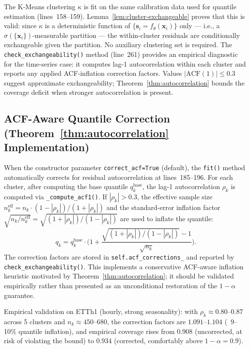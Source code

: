 \documentclass[11pt]{article}
\begin{document}
The K-Means clustering $\kappa$ is fit on the same calibration data used for quantile estimation (lines~158--159). Lemma~\ref{lem:cluster-exchangeable} proves that this is valid: since $\kappa$ is a deterministic function of $\{\mathbf{s}_i = f_\theta(\mathbf{x}_i)\}$ only — i.e., a $\sigma(\{\mathbf{x}_i\})$-measurable partition — the within-cluster residuals are conditionally exchangeable given the partition. No auxiliary clustering set is required. The \texttt{check\_exchangeability()} method (line~261) provides an empirical diagnostic for the time-series case: it computes lag-1 autocorrelation within each cluster and reports any applied ACF-inflation correction factors. Values $|\text{ACF}(1)| \leq 0.3$ suggest approximate exchangeability; Theorem~\ref{thm:autocorrelation} bounds the coverage deficit when stronger autocorrelation is present.

\subsection*{ACF-Aware Quantile Correction (Theorem~\ref{thm:autocorrelation} Implementation)}

When the constructor parameter \texttt{correct\_acf=True} (default), the \texttt{fit()} method automatically corrects for residual autocorrelation at lines~185--196. For each cluster, after computing the base quantile $q_k^{\text{base}}$, the lag-1 autocorrelation $\rho_k$ is computed via \texttt{\_compute\_acf1()}. If $|\rho_k| > 0.3$, the effective sample size $n_k^{\text{eff}} = n_k \cdot (1-|\rho_k|)/(1+|\rho_k|)$ and the standard-error inflation factor $\sqrt{n_k / n_k^{\text{eff}}} = \sqrt{(1+|\rho_k|)/(1-|\rho_k|)}$ are used to inflate the quantile:
\[
q_k = q_k^{\text{base}} \cdot \Big(1 + \frac{\sqrt{(1+|\rho_k|)/(1-|\rho_k|)} - 1}{\sqrt{n_k}}\Big).
\]
The correction factors are stored in \texttt{self.acf\_corrections\_} and reported by \texttt{check\_exchangeability()}. This implements a conservative ACF-aware inflation heuristic motivated by Theorem~\ref{thm:autocorrelation}; it should be validated empirically rather than presented as an unconditional restoration of the $1-\alpha$ guarantee.

Empirical validation on ETTh1 (hourly, strong seasonality): with $\rho_k \approx 0.80$--$0.87$ across 5 clusters and $n_k \approx 450$--$680$, the correction factors are $1.091$--$1.104$ (~9--10\% quantile inflation), and empirical coverage rises from $0.908$ (uncorrected, at risk of violating the bound) to $0.934$ (corrected, comfortably above $1-\alpha = 0.9$).
\end{document}
